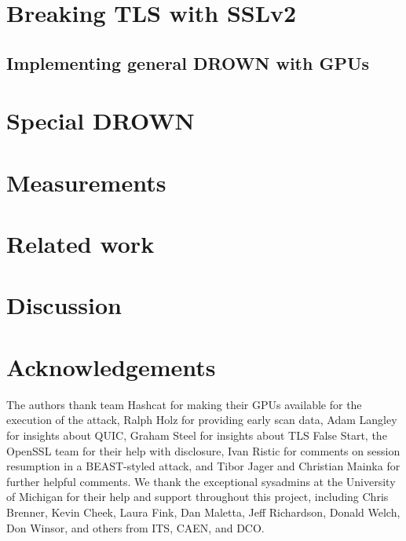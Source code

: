 \documentclass[letterpaper,twocolumn,10pt]{article}
\theoremstyle{plain}
\newif\ifblind\blindtrue
\begin{document}
\section{Breaking TLS with SSLv2}


\subsection{Implementing general DROWN with GPUs} 


\section{Special DROWN}





\section{Measurements}


\section{Related work}


\section{Discussion}


\ifblind
\else
\section*{Acknowledgements}

The authors thank team Hashcat for making their GPUs available for the execution of the attack,
Ralph Holz for providing early scan data, Adam Langley for insights about QUIC, Graham Steel for insights about TLS False Start, the OpenSSL team for their help with disclosure, Ivan Ristic for comments on session resumption in a BEAST-styled attack, and Tibor Jager and Christian Mainka for further helpful comments. %
We thank the exceptional sysadmins at the University of Michigan for their help
and support throughout this project, including Chris Brenner, Kevin Cheek,
Laura Fink, Dan Maletta, Jeff Richardson, Donald Welch, Don Winsor, and others
from ITS, CAEN, and DCO.
\end{document}
